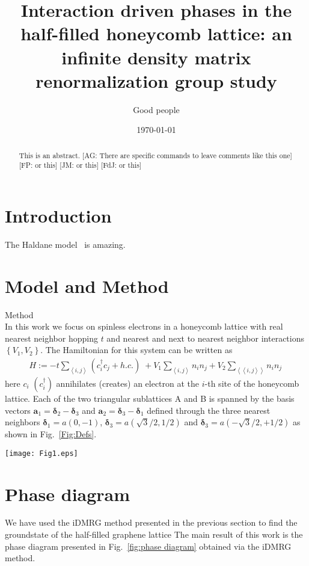 \documentclass[aps,prx,10pt,twocolumn,floatfix,superscriptaddress,showpacs,numerical,footinbib]{revtex4-1}
\newcommand{\noteAG}[1]{{\color{blue} [AG: #1]}}
\newcommand{\noteFP}[1]{{\color{magenta} [FP: #1]}}
\newcommand{\noteJM}[1]{{\color{red} [JM: #1]}}
\newcommand{\noteFdJ}[1]{{\color{cyan} [FdJ: #1]}}
\newcommand{\bs}[1]{{\boldsymbol{#1}}}
\begin{document}
%
\title{Interaction driven phases in the half-filled honeycomb lattice: an infinite density matrix renormalization group study}
%
\author{Good people}
%
\date{\today}
%
\begin{abstract}
%
This is an abstract. \noteAG{There are specific commands to leave comments like this one}\noteFP{or this}\noteJM{or this}\noteFdJ{or this}
%
\end{abstract}
%
\maketitle
%

\section{Introduction}
%
The Haldane model~\cite{H88} is amazing.
%
\section{Model and Method}
%
Method\\
%
In this work we focus on spinless electrons in a honeycomb lattice with real  nearest neighbor hopping $t$ and nearest and next to nearest neighbor interactions 
$\left\lbrace V_{1},V_{2}\right\rbrace$. 
%
The Hamiltonian for this system can be written as
\begin{eqnarray}
%
H:=-t\sum_{\left\langle i,j\right\rangle }(c^{\dagger}_{i}c_{j}+h.c.)
%
\;+
V_{1}\sum_{\left\langle i,j\right\rangle }n_{i}n_{j}+
%
V_{2}\sum_{\left\langle \left\langle i,j\right\rangle \right\rangle }n_{i}n_{j}\,
%
\label{eq:H}
%
\end{eqnarray}
%
here $c_{i}$ $(c^{\dagger}_{i})$  annihilates (creates) an electron at the $i$-th site of the honeycomb lattice. 
%
Each of the two triangular sublattices A and B is spanned by the basis vectors
$\bs{a}_{1}=\bs{\delta}_{2}-\bs{\delta}_{3}$ and 
$\bs{a}_{2}=\bs{\delta}_{3}-\bs{\delta}_{1}$ defined through the three nearest neighbors $\bs{\delta}_{1}=a(0,-1)$,  
$\bs{\delta}_{3}=a(\sqrt{3}/2,1/2)$ and $\bs{\delta}_{3}=a(-\sqrt{3}/2,+1/2)$ as shown in Fig.~\ref{Fig:Defs}.
%
\begin{figure*}[tb]
 \texttt{[image: Fig1.eps]}
 \caption{ 
  }
  \label{fig:honeycomblattice}
\end{figure*} 
% 
\section{Phase diagram}
%
We have used the iDMRG method presented in the previous section
to find the groundstate of the half-filled graphene lattice 
The main result of this work is the phase diagram presented in Fig.~\ref{fig:phase diagram} obtained
via the iDMRG method. 
%
\end{document}
